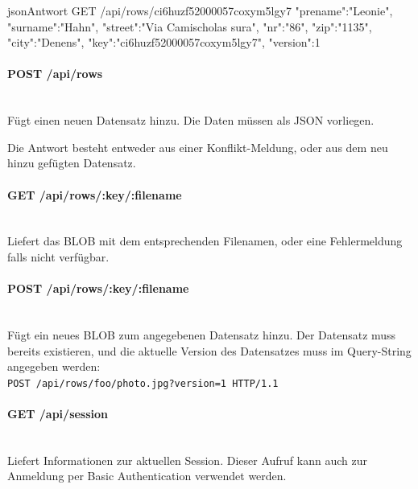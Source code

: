 \begin{srclst}{json}{Antwort GET /api/rows/ci6huzf52000057coxym5lgy7}
{
    "prename":"Leonie", "surname":"Hahn", 
    "street":"Via Camischolas sura", "nr":"86", 
    "zip":"1135", "city":"Denens", 
    "key":"ci6huzf52000057coxym5lgy7", "version":1
}
\end{srclst}

\paragraph{POST /api/rows} ~\\
Fügt einen neuen Datensatz hinzu. Die Daten müssen als JSON vorliegen.

Die Antwort besteht entweder aus einer Konflikt-Meldung, oder aus dem neu hinzu gefügten Datensatz.


\paragraph{GET /api/rows/:key/:filename} ~\\
Liefert das BLOB mit dem entsprechenden Filenamen, oder eine Fehlermeldung falls nicht verfügbar.

\paragraph{POST /api/rows/:key/:filename} ~\\
Fügt ein neues BLOB zum angegebenen Datensatz hinzu. Der Datensatz muss bereits existieren, und die aktuelle Version des Datensatzes muss im Query-String angegeben werden: \\
\texttt{POST /api/rows/foo/photo.jpg?version=1 HTTP/1.1}

\paragraph{GET /api/session} ~\\
Liefert Informationen zur aktuellen Session. Dieser Aufruf kann auch zur Anmeldung per Basic Authentication verwendet werden.

